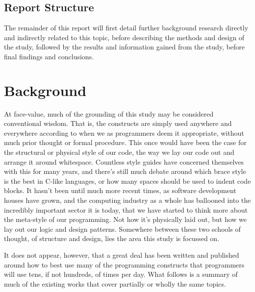 \documentclass{article}
\begin{document}
    \subsection{Report Structure}
        The remainder of this report will first detail further background research directly and indirectly related to this topic, before describing the methods and design of the study, followed by the results and information gained from the study, before final findings and conclusions.
\newpage
\section{Background}
\label{sec:background}
    At face-value, much of the grounding of this study may be considered conventional wisdom. That is, the constructs are simply used anywhere and everywhere according to when we as programmers deem it appropriate, without much prior thought or formal procedure. This once would have been the case for the structural or physical style of our code, the way we lay our code out and arrange it around whitespace. Countless style guides have concerned themselves with this for many years, and there's still much debate around which brace style is the best in C-like languages, or how many spaces should be used to indent code blocks. It hasn't been until much more recent times, as software development houses have grown, and the computing industry as a whole has ballooned into the incredibly important sector it is today, that we have started to think more about the meta-style of our programming. Not how it's physically laid out, but how we lay out our logic and design patterns. Somewhere between these two schools of thought, of structure and design, lies the area this study is focussed on.

    It does not appear, however, that a great deal has been written and published around how to best use many of the programming constructs that programmers will use tens, if not hundreds, of times per day. What follows is a summary of much of the existing works that cover partially or wholly the same topics.
\end{document}
